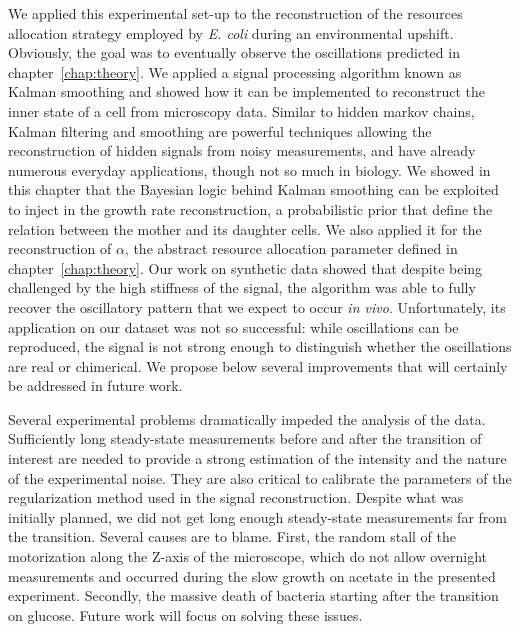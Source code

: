We applied this experimental set-up to the reconstruction of the resources allocation strategy employed by \textit{E. coli} during an environmental upshift.
Obviously, the goal was to eventually observe the oscillations predicted in chapter~\ref{chap:theory}.
We applied a signal processing algorithm known as Kalman smoothing and showed how it can be implemented to reconstruct the inner state of a cell from microscopy data.
Similar to hidden markov chains, Kalman filtering and smoothing are powerful techniques allowing the reconstruction of hidden signals from noisy measurements, and have already numerous everyday applications, though not so much in biology.
We showed in this chapter that the Bayesian logic behind Kalman smoothing can be exploited to inject in the growth rate reconstruction, a probabilistic prior that define the relation between the mother and its daughter cells.
We also applied it for the reconstruction of $\alpha$, the abstract resource allocation parameter defined in chapter~\ref{chap:theory}.
Our work on synthetic data showed that despite being challenged by the high stiffness of the signal, the algorithm was able to fully recover the oscillatory pattern that we expect to occur \textit{in vivo}.
Unfortunately, its application on our dataset was not so successful: while oscillations can be reproduced, the signal is not strong enough to distinguish whether the oscillations are real or chimerical.
We propose below several improvements that will certainly be addressed in future work.

Several experimental problems dramatically impeded the analysis of the data.
Sufficiently long steady-state measurements before and after the transition of interest are needed to provide a strong estimation of the intensity and the nature of the experimental noise.
They are also critical to calibrate the parameters of the regularization method used in the signal reconstruction.
Despite what was initially planned, we did not get long enough steady-state measurements far from the transition.
Several causes are to blame.
First, the random stall of the motorization along the Z-axis of the microscope, which do not allow overnight measurements and occurred during the slow growth on acetate in the presented experiment.
Secondly, the massive death of bacteria starting after the transition on glucose.
Future work will focus on solving these issues.

